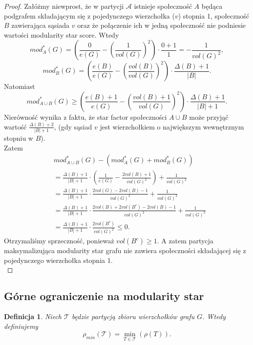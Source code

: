 \documentclass[letterpaper,12pt]{article}
\newtheorem{definition}{Definicja}
\begin{document}
\begin{proof}
  Załóżmy niewprost, że w partycji \(\mathcal{A}\) istnieje społeczność \(A\) będąca podgrafem składającym się z pojedynczego wierzchołka (\(v\)) stopnia 1, społeczność \(B\) zawierająca sąsiada \(v\) oraz że połączenie ich w jedną społeczność nie podniesie wartości modularity star score. Wtedy
  \[
    mod_A^*(G) = \left(\frac{0}{e(G)} - {\left(\frac{1}{vol(G)}\right)}^2\right) \cdot \frac{0+1}{1} = -\frac{1}{vol(G)^2},
  \]
  \[
    mod_B^*(G) = \left(\frac{e(B)}{e(G)} - {\left(\frac{vol(B)}{vol(G)}\right)}^2\right) \cdot \frac{\Delta(B)+1}{|B|}.
  \]
  Natomiast
  \[
    mod_{A \cup B}^*(G) \geq \left(\frac{e(B)+1}{e(G)} - {\left(\frac{vol(B)+1}{vol(G)}\right)}^2\right) \cdot \frac{\Delta(B)+1}{|B|+1}.
  \]
  Nierówność wynika z faktu, że star factor społeczności \(A \cup B\) może przyjąć wartość \(\frac{\Delta(B)+2}{|B|+1}\), (gdy sąsiad \(v\) jest wierzchołkiem o największym wewnętrznym stopniu w \(B\)).\\
  Zatem
  \begin{align*}
     & mod_{A \cup B}^*(G) - \left(mod_A^*(G)+mod_B^*(G)\right)                                                        \\
     & = \frac{\Delta(B)+1}{|B|+1} \cdot \left(\frac{1}{e(G)} - \frac{2vol(B)+1}{vol(G)^2}\right) + \frac{1}{vol(G)^2} \\
     & = \frac{\Delta(B)+1}{|B|+1} \cdot \frac{2vol(G)-2vol(B)-1}{vol(G)^2} + \frac{1}{vol(G)^2}                       \\
     & = \frac{\Delta(B)+1}{|B|+1} \cdot \frac{2vol(B)+2vol(B^c)-2vol(B)-1}{vol(G)^2} + \frac{1}{vol(G)^2}             \\
     & = \frac{\Delta(B)+1}{|B|+1} \cdot \frac{2vol(B^c)}{vol(G)^2} \leq 0.
  \end{align*}
  Otrzymaliśmy sprzeczność, ponieważ \(vol(B^c) \geq 1\). A zatem partycja maksymalizująca modularity star grafu nie zawiera społeczności składającej się z pojedynczego wierzchołka stopnia 1.\\
\end{proof}

\subsection{Górne ograniczenie na modularity star}
\begin{definition}
  Niech \(\mathcal{T}\) będzie partycją zbioru wierzchołków grafu \(G\). Wtedy definiujemy
  \[\rho_{min}(\mathcal{T})=\displaystyle \min_{T\in\mathcal{T}}(\rho(T)).\]
\end{definition}
\end{document}
